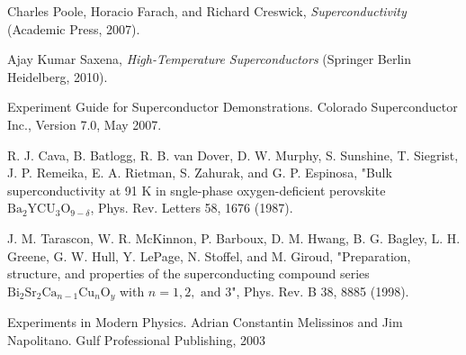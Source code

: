 \documentclass[prb,preprint]{revtex4-1}
\begin{document}
\begin{thebibliography}{99}

 Charles Poole, Horacio Farach, and Richard Creswick, \textit{Superconductivity} (Academic Press, 2007).

 Ajay Kumar Saxena, \textit{High-Temperature Superconductors} (Springer Berlin Heidelberg, 2010).

 Experiment Guide for Superconductor Demonstrations. Colorado Superconductor Inc., Version 7.0, May 2007.

 R. J. Cava, B. Batlogg, R. B. van Dover, D. W. Murphy, S. Sunshine, T. Siegrist, J. P. Remeika, E. A. Rietman, S. Zahurak, and G. P. Espinosa, "Bulk superconductivity at 91 K in sngle-phase oxygen-deficient perovskite $\text{Ba}_2\text{YCU}_3\text{O}_{9-\delta}$, Phys. Rev. Letters 58, 1676 (1987).

 J. M. Tarascon, W. R. McKinnon, P. Barboux, D. M. Hwang, B. G. Bagley, L. H. Greene, G. W. Hull, Y. LePage, N. Stoffel, and M. Giroud, "Preparation, structure, and properties of the superconducting compound series $\text{Bi}_2\text{Sr}_2\text{Ca}_{n-1}\text{Cu}_{n}\text{O}_y$ with $n=1,2,\text{ and }3$", Phys. Rev. B 38, 8885 (1998).

 Experiments in Modern Physics.  Adrian Constantin Melissinos and Jim Napolitano.  Gulf Professional Publishing, 2003



\end{thebibliography}


\end{document}

